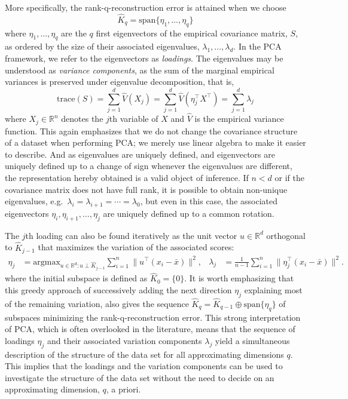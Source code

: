 \documentclass[titlepage,11pt,twoside]{article}
\newcommand{\RR}{\mathbb{R}}
\newcommand{\argmax}{\text{argmax}}
\begin{document}
More specifically, the rank-q-reconstruction error is attained when we choose
\begin{equation*}
\hat{K}_q = \text{span}\{\eta_1,\dotsc,\eta_q\}
\end{equation*}
where $\eta_1, ..., \eta_q$ are the $q$ first eigenvectors of the empirical covariance matrix, $S$, as ordered by the size of their associated eigenvalues, $\lambda_1, ..., \lambda_d$. In the PCA framework, we refer to the eigenvectors as \textit{loadings}. The eigenvalues may be understood as \textit{variance components}, as the sum of the marginal empirical variances is preserved under eigenvalue decomposition, that is,
$$\text{trace}(S) = \sum_{j=1}^d \hat{V}(X_j) = \sum_{j=1}^d \hat{V}(\eta_j^\top X^\top) = \sum_{j=1}^d \lambda_j$$
where $X_j \in \RR^n$ denotes the $j$th variable of $X$ and $\hat{V}$ is the empirical variance function. This again emphasizes that we do not change the covariance structure of a dataset when performing PCA; we merely use linear algebra to make it easier to describe. And as eigenvalues are uniquely defined, and eigenvectors are uniquely defined up to a change of sign whenever the eigenvalues are different, the representation hereby obtained is a valid object of inference. If $n < d$ or if the covariance matrix does not have full rank, it is possible to obtain non-unique eigenvalues, e.g.\ $\lambda_i=\lambda_{i+1}=\dotsm=\lambda_0$, but even in this case, the associated eigenvectors $\eta_i,\eta_{i+1},\dotsc,\eta_j$ are uniquely defined up to a common rotation. 

The $j$th loading can also be found iteratively as the unit vector $u \in \RR^d$ orthogonal to $\hat{K}_{j-1}$ that maximizes the variation of the associated scores:
\begin{align*}
\eta_j &= \argmax_{u \in \RR^d\colon u \perp \hat{K}_{j-1}} \sum_{i=1}^n \lVert u^\top (x_i - \bar{x}) \rVert^2, &
\lambda_j &= \frac{1}{n-1} \sum_{i=1}^n \lVert \eta_j^\top (x_i - \bar{x}) \rVert^2.
\end{align*}
where the initial subspace is defined as $\hat{K}_0 = \{0\}$. It is worth emphasizing that this greedy approach of successively adding the next direction $\eta_j$ explaining most of the remaining variation, also gives the sequence $\hat{K}_q = \hat{K}_{q-1} \oplus \text{span} \{\eta_q\}$ of subspaces minimizing the rank-q-reconstruction error. This strong interpretation of PCA, which is often overlooked in the literature, means that the sequence of loadings $\eta_j$ and their associated variation components $\lambda_j$ yield a simultaneous description of the structure of the data set for all approximating dimensions $q$. This implies that the loadings and the variation components can be used to investigate the structure of the data set without the need to decide on an approximating dimension, $q$, a priori.
\end{document}
